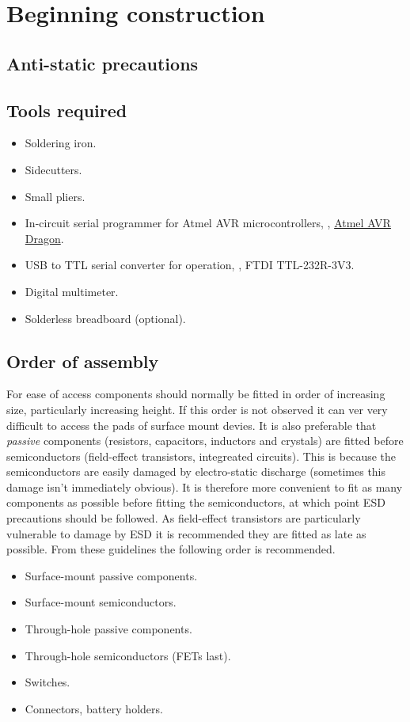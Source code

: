 \chapter{Beginning construction}

\section{Anti-static precautions}

\section{Tools required}

\begin{itemize}
\item Soldering iron.
\item Sidecutters.
\item Small pliers.
\item In-circuit serial programmer for Atmel AVR microcontrollers,
  \eg, \href{http://www.atmel.com/tools/AVRDRAGON.aspx}{Atmel AVR Dragon}.
\item USB to TTL serial converter for  operation, \eg, FTDI
  TTL-232R-3V3.
\item Digital multimeter.
\item Solderless breadboard (optional).
\end{itemize}

\section{Order of assembly}

For ease of access components should normally be fitted in order of
increasing size, particularly increasing height. If this order is not
observed it can ver very difficult to access the pads of surface mount
devies. It is also preferable that \emph{passive} components
(resistors, capacitors, inductors and crystals) are fitted before
semiconductors (field-effect transistors, integreated circuits). This
is because the semiconductors are easily damaged by electro-static
discharge (sometimes this damage isn't immediately obvious). It is
therefore more convenient to fit as many components as possible before
fitting the semiconductors, at which point ESD precautions should be
followed. As field-effect transistors are particularly vulnerable to
damage by ESD it is recommended they are fitted as late as possible.
From these guidelines the following order is recommended.
\begin{itemize}
\item Surface-mount passive components.
\item Surface-mount semiconductors.
\item Through-hole passive components.
\item Through-hole semiconductors (FETs last).
\item Switches.
\item Connectors, battery holders.
\end{itemize}
